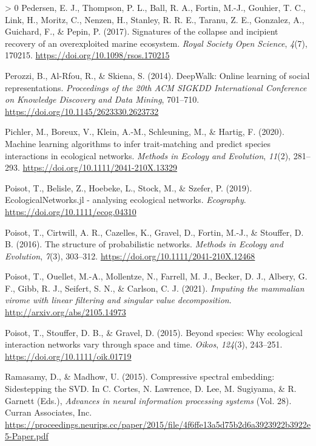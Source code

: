 \documentclass[10pt,oneside]{article}
\newlength{\cslhangindent}
\newenvironment{CSLReferences}[3] %
 {%
  \setlength{\parindent}{0pt}
  \ifodd #1 \everypar{\setlength{\hangindent}{\cslhangindent}}\ignorespaces\fi
  \ifnum #2 > 0
  \setlength{\parskip}{#2\baselineskip}
  \fi
 }%
 {}
\begin{document}
\begin{CSLReferences}{1}{0}
\leavevmode\hypertarget{ref-Pedersen2017SigCol}{}%
Pedersen, E. J., Thompson, P. L., Ball, R. A., Fortin, M.-J., Gouhier,
T. C., Link, H., Moritz, C., Nenzen, H., Stanley, R. R. E., Taranu, Z.
E., Gonzalez, A., Guichard, F., \& Pepin, P. (2017). Signatures of the
collapse and incipient recovery of an overexploited marine ecosystem.
\emph{Royal Society Open Science}, \emph{4}(7), 170215.
\url{https://doi.org/10.1098/rsos.170215}

\leavevmode\hypertarget{ref-Perozzi2014DeeOnl}{}%
Perozzi, B., Al-Rfou, R., \& Skiena, S. (2014). DeepWalk: Online
learning of social representations. \emph{Proceedings of the 20th ACM
SIGKDD International Conference on Knowledge Discovery and Data Mining},
701--710. \url{https://doi.org/10.1145/2623330.2623732}

\leavevmode\hypertarget{ref-Pichler2020MacLea}{}%
Pichler, M., Boreux, V., Klein, A.-M., Schleuning, M., \& Hartig, F.
(2020). Machine learning algorithms to infer trait-matching and predict
species interactions in ecological networks. \emph{Methods in Ecology
and Evolution}, \emph{11}(2), 281--293.
\url{https://doi.org/10.1111/2041-210X.13329}

\leavevmode\hypertarget{ref-Poisot2019EcoJl}{}%
Poisot, T., Belisle, Z., Hoebeke, L., Stock, M., \& Szefer, P. (2019).
EcologicalNetworks.jl - analysing ecological networks. \emph{Ecography}.
\url{https://doi.org/10.1111/ecog.04310}

\leavevmode\hypertarget{ref-Poisot2016StrPro}{}%
Poisot, T., Cirtwill, A. R., Cazelles, K., Gravel, D., Fortin, M.-J., \&
Stouffer, D. B. (2016). The structure of probabilistic networks.
\emph{Methods in Ecology and Evolution}, \emph{7}(3), 303--312.
\url{https://doi.org/10.1111/2041-210X.12468}

\leavevmode\hypertarget{ref-Poisot2021ImpMam}{}%
Poisot, T., Ouellet, M.-A., Mollentze, N., Farrell, M. J., Becker, D.
J., Albery, G. F., Gibb, R. J., Seifert, S. N., \& Carlson, C. J.
(2021). \emph{Imputing the mammalian virome with linear filtering and
singular value decomposition}. \url{http://arxiv.org/abs/2105.14973}

\leavevmode\hypertarget{ref-Poisot2015SpeWhy}{}%
Poisot, T., Stouffer, D. B., \& Gravel, D. (2015). Beyond species: Why
ecological interaction networks vary through space and time.
\emph{Oikos}, \emph{124}(3), 243--251.
\url{https://doi.org/10.1111/oik.01719}

\leavevmode\hypertarget{ref-Ramasamy2015ComSpe}{}%
Ramasamy, D., \& Madhow, U. (2015). Compressive spectral embedding:
Sidestepping the SVD. In C. Cortes, N. Lawrence, D. Lee, M. Sugiyama, \&
R. Garnett (Eds.), \emph{Advances in neural information processing
systems} (Vol. 28). Curran Associates, Inc.
\url{https://proceedings.neurips.cc/paper/2015/file/4f6ffe13a5d75b2d6a3923922b3922e5-Paper.pdf}


\end{CSLReferences}
\end{document}
